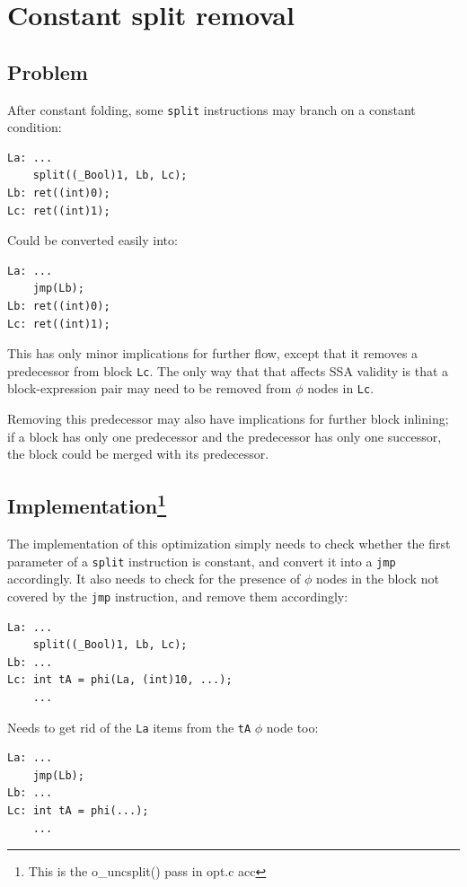 \documentclass[12pt, a4paper]{article}
\begin{document}
\section{Constant split removal}
\subsection{Problem}
After constant folding, some \verb+split+ instructions may branch on a constant
condition:

\begin{lstlisting}
La:	...
	split((_Bool)1, Lb, Lc);
Lb:	ret((int)0);
Lc:	ret((int)1);
\end{lstlisting}

Could be converted easily into:

\begin{lstlisting}
La:	...
	jmp(Lb);
Lb:	ret((int)0);
Lc:	ret((int)1);
\end{lstlisting}

This has only minor implications for further flow, except that it removes a
predecessor from block \verb+Lc+. The only way that that affects SSA validity is
that a block-expression pair may need to be removed from $\phi$ nodes in
\verb+Lc+.

Removing this predecessor may also have implications for further block inlining;
if a block has only one predecessor and the predecessor has only one successor,
the block could be merged with its predecessor.

\subsection[Implementation] {Implementation\footnote{This is the o\_uncsplit() pass in opt.c acc} }
The implementation of this optimization simply needs to check whether the first
parameter of a \verb+split+ instruction is constant, and convert it into a
\verb+jmp+ accordingly. It also needs to check for the presence of $\phi$ nodes
in the block not covered by the \verb+jmp+ instruction, and remove them accordingly:

\begin{lstlisting}
La:	...
	split((_Bool)1, Lb, Lc);
Lb:	...
Lc:	int tA = phi(La, (int)10, ...);
	...
\end{lstlisting}

Needs to get rid of the \verb+La+ items from the \verb+tA+ $\phi$ node too:

\begin{lstlisting}
La:	...
	jmp(Lb);
Lb:	...
Lc:	int tA = phi(...);
	...
\end{lstlisting}
\end{document}
